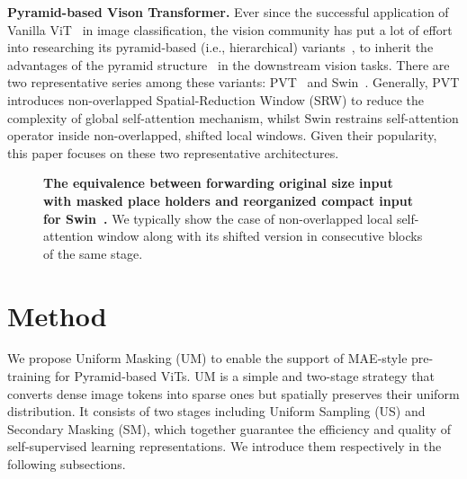 \documentclass{article}
\begin{document}
\textbf{Pyramid-based Vison Transformer.} Ever since the successful application of Vanilla ViT~\cite{dosovitskiy2020image} in image classification, the vision community has put a lot of effort into researching its pyramid-based (i.e., hierarchical) variants~\cite{wang2021pyramid,wang2022pvtv2,yuan2021tokens,heo2021rethinking,wu2021cvt,liu2021swin,liu2021swinv2,srinivas2021bottleneck,chu2021twins,dong2021cswin,guo2021cmt,yang2021focal,fan2021multiscale,zhang2022nested,graham2021levit,zhang2021rest,gao2021container}, to inherit the advantages of the pyramid structure~\cite{lin2017feature} in the downstream vision tasks. There are two representative series among these variants: PVT~\cite{wang2021pyramid,wang2022pvtv2} and Swin~\cite{liu2021swin,liu2021swinv2}. Generally, PVT introduces non-overlapped Spatial-Reduction Window (SRW) to reduce the complexity of global self-attention mechanism, whilst Swin restrains self-attention operator inside non-overlapped, shifted local windows. Given their popularity, this paper focuses on these two representative architectures.

\begin{figure}[t]
	\vspace{0pt}
	\begin{center}
		\setlength{\fboxrule}{0pt}
	\end{center}	
	\vspace{-9pt}
	\caption{\textbf{The equivalence between forwarding original size input with masked place holders and reorganized compact input for Swin~\cite{liu2021swin}.} We typically show the case of non-overlapped local self-attention window along with its shifted version in consecutive blocks of the same stage.
	}
	\label{fig_swin_equivalence}
	\vspace{-10pt}
\end{figure}



\section{Method}\label{sec:Method}
We propose Uniform Masking (UM) to enable the support of MAE-style pre-training for Pyramid-based ViTs.
UM is a simple and two-stage strategy that converts dense image tokens into sparse ones but spatially preserves their uniform distribution. It consists of two stages including Uniform Sampling (US) and Secondary Masking (SM), which together guarantee the efficiency and quality of self-supervised learning representations. We introduce them respectively in the following subsections.
\end{document}
